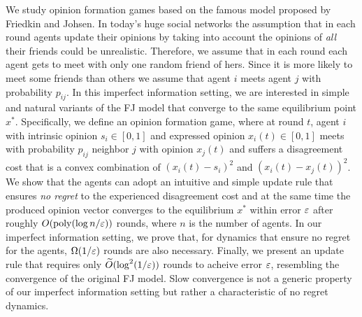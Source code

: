 We study opinion formation games based on the famous model proposed by Friedkin
and Johsen.  In today's huge social networks the assumption that in each round
agents update their opinions by taking into account the opinions of \emph{all}
their friends could be unrealistic. Therefore, we assume that in each round
each agent gets to meet with only one random friend of hers. Since it is more
likely to meet some friends than others we assume that agent $i$ meets agent
$j$ with probability $p_{ij}$.  In this imperfect information setting, we are
interested in simple and natural variants of the FJ model that converge to the
same equilibrium point $x^*$.  Specifically, we define an opinion formation
game, where at round $t$, agent $i$ with intrinsic opinion $s_i\in[0,1]$ and
expressed opinion $x_i(t) \in[0,1]$ meets with probability $p_{ij}$ neighbor
$j$ with opinion $x_j(t)$ and suffers a disagreement cost that is a convex
combination of $(x_i(t) - s_i)^2$ and $(x_i(t) - x_j(t))^2$.  We show that the
agents can adopt an intuitive and simple update rule that ensures
\emph{no regret} to the experienced disagreement cost and at the same time the
produced opinion vector converges to the equilibrium $x^*$ within error $\varepsilon$
after roughly $O(\mathrm{poly}(\log n /\varepsilon))$ rounds, where $n$ is the number of
agents.  In our imperfect information setting, we prove that, for dynamics that
ensure no regret for the agents, $\Omega(1/\varepsilon)$ rounds are also necessary.
Finally, we present an update rule that requires only
$\widetilde{O}(\log^2(1/\varepsilon))$ rounds to acheive error $\varepsilon$,
resembling the convergence of the original FJ model.  Slow convergence is not
a generic property of our imperfect information setting but rather a
characteristic of no regret dynamics.
